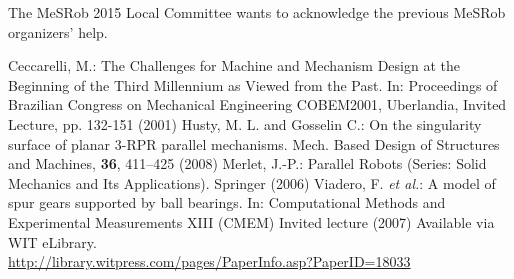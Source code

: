 \documentclass{svmult}
\begin{document}
\begin{acknowledgement}
The MeSRob 2015 Local Committee wants to acknowledge the previous MeSRob organizers' help.
\end{acknowledgement}

\begin{thebibliography}{99.}

 Ceccarelli, M.: The Challenges for Machine and Mechanism Design at the Beginning of the Third Millennium as Viewed from the Past. In:  Proceedings of Brazilian Congress on Mechanical Engineering COBEM2001, Uberlandia, Invited Lecture, pp. 132-151 (2001)
 Husty, M. L. and Gosselin C.: On the singularity surface of planar 3-RPR parallel mechanisms. Mech. Based Design of Structures and Machines, \textbf{36}, 411--425 (2008)
 Merlet, J.-P.: Parallel Robots (Series: Solid Mechanics and Its Applications). Springer (2006)
 Viadero, F. \textit{et al.}: A model of spur gears supported by ball bearings. In: Computational Methods and Experimental Measurements XIII (CMEM) Invited lecture (2007) Available via WIT eLibrary. \\
\url{http://library.witpress.com/pages/PaperInfo.asp?PaperID=18033}

\end{thebibliography}

%
%
\end{document}
